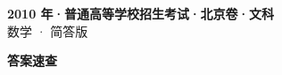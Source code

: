 \documentclass[zihao=-4, a4paper]{ctexart}
\begin{document}
\begin{center}
  {\Large\bfseries 2010 年·普通高等学校招生考试·北京卷·文科}\\[4pt]
  {\large 数学 · 简答版}
\end{center}
\medskip
{}

\clearpage
{}
\begin{center}{\Large\bfseries 答案速查}\end{center}
\medskip

\end{document}
